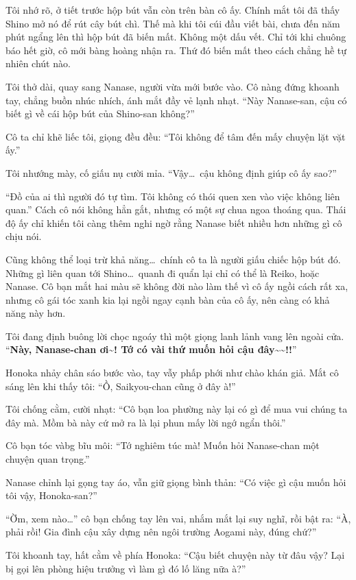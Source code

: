 \documentclass[../main.tex]{subfiles}
\begin{document}
Tôi nhớ rõ, ở tiết trước hộp bút vẫn còn trên bàn cô ấy. Chính mắt tôi đã thấy Shino mở nó để rút cây bút chì. Thế mà khi tôi cúi đầu viết bài, chưa đến năm phút ngẩng lên thì hộp bút đã biến mất. Không một dấu vết. Chỉ tới khi chuông báo hết giờ, cô mới bàng hoàng nhận ra. Thứ đó biến mất theo cách chẳng hề tự nhiên chút nào.

Tôi thở dài, quay sang Nanase, người vừa mới bước vào. Cô nàng đứng khoanh tay, chẳng buồn nhúc nhích, ánh mắt đầy vẻ lạnh nhạt. ``Này Nanase-san, cậu có biết gì về cái hộp bút của Shino-san không?''

Cô ta chỉ khẽ liếc tôi, giọng đều đều: ``Tôi không để tâm đến mấy chuyện lặt vặt ấy.''

Tôi nhướng mày, cố giấu nụ cười mỉa. ``Vậy\dots\ cậu không định giúp cô ấy sao?''

``Đồ của ai thì người đó tự tìm. Tôi không có thói quen xen vào việc không liên quan.'' Cách cô nói không hẳn gắt, nhưng có một sự chua ngoa thoáng qua. Thái độ ấy chỉ khiến tôi càng thêm nghi ngờ rằng Nanase biết nhiều hơn những gì cô chịu nói.

Cũng không thể loại trừ khả năng\dots\ chính cô ta là người giấu chiếc hộp bút đó. Những gì liên quan tới Shino\dots\ quanh đi quẩn lại chỉ có thể là Reiko, hoặc Nanase. Cô bạn mắt hai màu sẽ không đời nào làm thế vì cô ấy ngồi cách rất xa, nhưng cô gái tóc xanh kia lại ngồi ngay cạnh bàn của cô ấy, nên càng có khả năng này hơn.

Tôi đang định buông lời chọc ngoáy thì một giọng lanh lảnh vang lên ngoài cửa. ``\textbf{Này, Nanase-chan ơi\~{}! Tớ có vài thứ muốn hỏi cậu đây\~{}\~{}!!}''

Honoka nhảy chân sáo bước vào, tay vẫy phấp phới như chào khán giả. Mắt cô sáng lên khi thấy tôi: ``Ồ, Saikyou-chan cũng ở đây à!''

Tôi chống cằm, cười nhạt: ``Cô bạn loa phường này lại có gì để mua vui chúng ta đây mà. Mồm bà này cứ mở ra là lại phun mấy lời ngớ ngẩn thôi.''

Cô bạn tóc vàbg bĩu môi: ``Tớ nghiêm túc mà! Muốn hỏi Nanase-chan một chuyện quan trọng.''

Nanase chỉnh lại gọng tay áo, vẫn giữ giọng bình thản: ``Có việc gì cậu muốn hỏi tôi vậy, Honoka-san?''

``Ờm, xem nào\dots'' cô bạn chống tay lên vai, nhắm mắt lại suy nghĩ, rồi bật ra: ``À, phải rồi! Gia đình cậu xây dựng nên ngôi trường Aogami này, đúng chứ?''

Tôi khoanh tay, hất cằm về phía Honoka: ``Cậu biết chuyện này từ đâu vậy? Lại bị gọi lên phòng hiệu trưởng vì làm gì đó lố lăng nữa à?''
\end{document}
